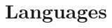 \documentclass[8pt,landscape,a4paper]{article}
\title{Languages}
\author{}
\date{} %
\begin{document}
\maketitle

{\footnotesize

}

\clearpage
\newpage



\end{document}
